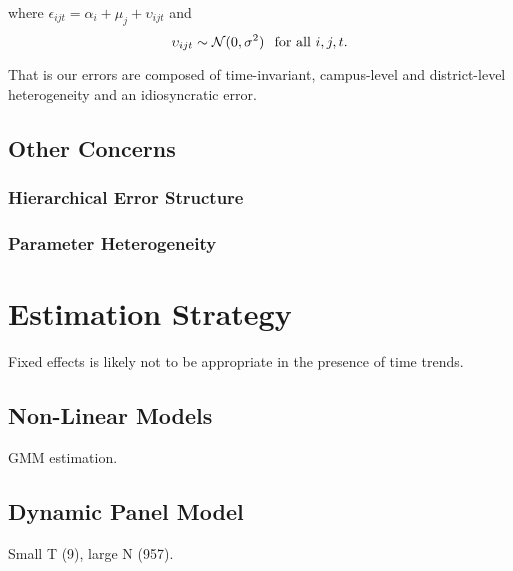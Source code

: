 \documentclass[11pt]{article}
\newcommand{\N}{\mathcal{N}}
\begin{document}
where $\epsilon_{ijt}=\alpha_{i}+\mu_{j}+\upsilon_{ijt}$ and
$$\upsilon_{ijt} \sim \N(0,\sigma^2) \hspace{0.1in} \mbox{for all } i,j,t.$$

That is  our errors are composed of time-invariant, campus-level and district-level heterogeneity and an idiosyncratic error. 

\subsection{Other Concerns}

\subsubsection{Hierarchical Error Structure}

\subsubsection{Parameter Heterogeneity}




\section{Estimation Strategy}

Fixed effects is likely not to be appropriate in the presence of time trends. 

\subsection{Non-Linear Models}

GMM estimation.

\subsection{Dynamic Panel Model}

Small T (9), large N (957). 
\end{document}

